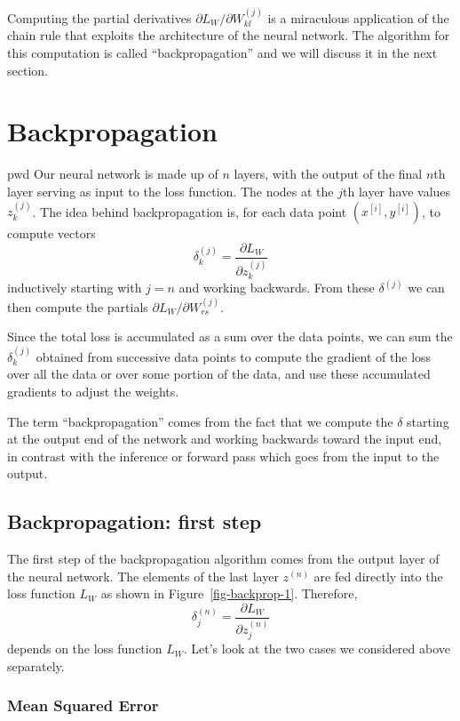 \documentclass[
  11pt,
  letterpaper,
]{scrbook}
\theoremstyle{plain}
\theoremstyle{remark}
\begin{document}
Computing the partial derivatives
\(\partial L_{W}/\partial W^{(j)}_{kl}\) is a miraculous application of
the chain rule that exploits the architecture of the neural network. The
algorithm for this computation is called ``backpropagation'' and we will
discuss it in the next section.

\hypertarget{backpropagation}{%
\section{Backpropagation}\label{backpropagation}}

pwd Our neural network is made up of \(n\) layers, with the output of
the final \(n\)th layer serving as input to the loss function. The nodes
at the \(j\)th layer have values \(z^{(j)}_{k}\). The idea behind
backpropagation is, for each data point \((x^{[i]},y^{[i]})\), to
compute vectors \[
\delta^{(j)}_{k} = \frac{\partial L_{W}}{\partial z^{(j)}_{k}}
\] inductively starting with \(j=n\) and working backwards. From these
\(\delta^{(j)}\) we can then compute the partials
\(\partial L_{W}/\partial W^{(j)}_{rs}\).

Since the total loss is accumulated as a sum over the data points, we
can sum the \(\delta^{(j)}_{k}\) obtained from successive data points to
compute the gradient of the loss over all the data or over some portion
of the data, and use these accumulated gradients to adjust the weights.

The term ``backpropagation'' comes from the fact that we compute the
\(\delta\) starting at the output end of the network and working
backwards toward the input end, in contrast with the inference or
forward pass which goes from the input to the output.

\hypertarget{backpropagation-first-step}{%
\subsection{Backpropagation: first
step}\label{backpropagation-first-step}}

The first step of the backpropagation algorithm comes from the output
layer of the neural network. The elements of the last layer \(z^{(n)}\)
are fed directly into the loss function \(L_{W}\) as shown in
Figure~\ref{fig-backprop-1}. Therefore, \[
\delta^{(n)}_j = \frac{\partial L_{W}}{\partial z^{(n)}_{j}}
\] depends on the loss function \(L_{W}\). Let's look at the two cases
we considered above separately.

\hypertarget{mean-squared-error}{%
\subsubsection{Mean Squared Error}\label{mean-squared-error}}
\end{document}
